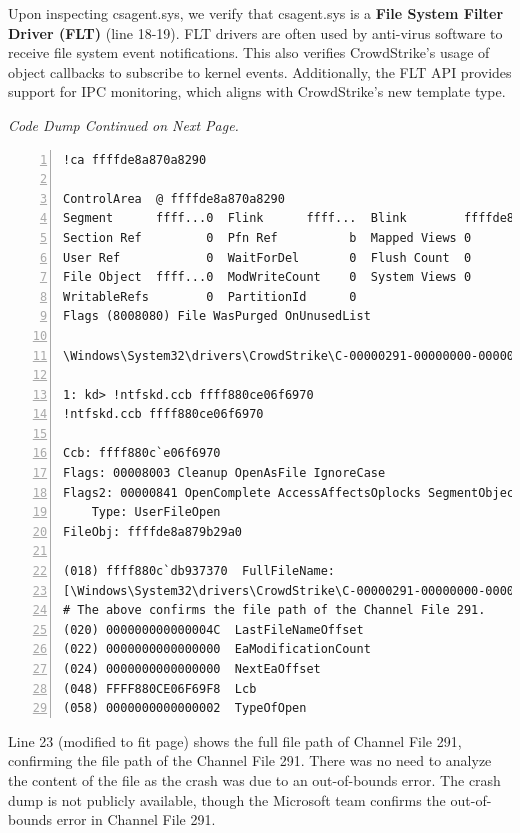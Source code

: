 \vspace{2em}

\noindent
Upon inspecting csagent.sys, we verify that csagent.sys is a \textbf{File System Filter Driver (FLT)} (line 18-19). FLT drivers are often used by anti-virus software to receive file system event notifications. This also verifies CrowdStrike's usage of object callbacks to subscribe to kernel events. Additionally, the FLT API provides support for IPC monitoring, which aligns with CrowdStrike's new template type.

\vfill 
\begin{center}
    \textit{Code Dump Continued on Next Page.}
\end{center}
\vfill

\newpage

\begin{lstlisting}[caption=Inspecting csagent.sys, numbers=left]
!ca ffffde8a870a8290

ControlArea  @ ffffde8a870a8290
Segment      ffff...0  Flink      ffff...  Blink        ffffde8a870a7d98
Section Ref         0  Pfn Ref          b  Mapped Views 0
User Ref            0  WaitForDel       0  Flush Count  0
File Object  ffff...0  ModWriteCount    0  System Views 0
WritableRefs        0  PartitionId      0  
Flags (8008080) File WasPurged OnUnusedList 

\Windows\System32\drivers\CrowdStrike\C-00000291-00000000-00000032.sys
    
1: kd> !ntfskd.ccb ffff880ce06f6970
!ntfskd.ccb ffff880ce06f6970
    
Ccb: ffff880c`e06f6970
Flags: 00008003 Cleanup OpenAsFile IgnoreCase
Flags2: 00000841 OpenComplete AccessAffectsOplocks SegmentObjectReferenced
    Type: UserFileOpen
FileObj: ffffde8a879b29a0
    
(018) ffff880c`db937370  FullFileName: 
[\Windows\System32\drivers\CrowdStrike\C-00000291-00000000-00000032.sys]
# The above confirms the file path of the Channel File 291.
(020) 000000000000004C  LastFileNameOffset 
(022) 0000000000000000  EaModificationCount 
(024) 0000000000000000  NextEaOffset 
(048) FFFF880CE06F69F8  Lcb 
(058) 0000000000000002  TypeOfOpen 
\end{lstlisting}

\noindent

\noindent
Line 23 (modified to fit page) shows the full file path of Channel File 291, confirming the file path of the Channel File 291. There was no need to analyze the content of the file as the crash was due to an out-of-bounds error. The crash dump is not publicly available, though the Microsoft team confirms the out-of-bounds error in Channel File 291.


